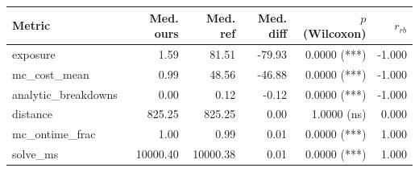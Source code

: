 \begin{tabular}{lrrrrr}
\toprule
Metric & Med. ours & Med. ref & Med. diff & $p$ (Wilcoxon) & $r_{rb}$ \\
\midrule
exposure & 1.59 & 81.51 & -79.93 & 0.0000 (***) & -1.000 \\
mc_cost_mean & 0.99 & 48.56 & -46.88 & 0.0000 (***) & -1.000 \\
analytic_breakdowns & 0.00 & 0.12 & -0.12 & 0.0000 (***) & -1.000 \\
distance & 825.25 & 825.25 & 0.00 & 1.0000 (ns) & 0.000 \\
mc_ontime_frac & 1.00 & 0.99 & 0.01 & 0.0000 (***) & 1.000 \\
solve_ms & 10000.40 & 10000.38 & 0.01 & 0.0000 (***) & 1.000 \\
\bottomrule
\end{tabular}
